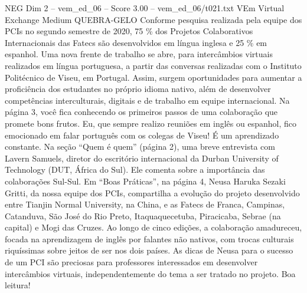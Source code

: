 \begin{textsample}{NEG Dim 2 – vem\_ed\_06 – Score 3.00 – vem\_ed\_06/t021.txt}  \label{ex:f2_neg_098}
VEm Virtual Exchange Medium QUEBRA-GELO Conforme pesquisa realizada pela equipe dos PCIs no segundo semestre de 2020, 75 \% dos Projetos Colaborativos Internacionais das Fatecs são desenvolvidos em língua inglesa e 25 \% em espanhol.
Uma nova frente de trabalho se abre, para intercâmbios virtuais realizados em língua portuguesa, a partir das conversas realizadas com o Instituto Politécnico de Viseu, em Portugal.
Assim, surgem oportunidades para aumentar a proficiência dos estudantes no próprio idioma nativo, além de desenvolver competências interculturais, digitais e de trabalho em equipe internacional.
Na página 3, você fica conhecendo os primeiros passos de uma colaboração que promete bons frutos.
Eu, que sempre realizo reuniões em inglês ou espanhol, fico emocionado em falar português com os colegas de Viseu!
É um aprendizado constante.
Na seção “Quem é quem” (página 2), uma breve entrevista com Lavern Samuels, diretor do escritório internacional da Durban University of Technology (DUT, África do Sul).
Ele comenta sobre a importância das colaborações Sul-Sul.
Em “Boas Práticas”, na página 4, Neusa Haruka Sezaki Gritti, da nossa equipe dos PCIs, compartilha a evolução do projeto desenvolvido entre Tianjin Normal University, na China, e as Fatecs de Franca, Campinas, Catanduva, São José do Rio Preto, Itaquaquecetuba, Piracicaba, Sebrae (na capital) e Mogi das Cruzes.
Ao longo de cinco edições, a colaboração amadureceu, focada na aprendizagem de inglês por falantes não nativos, com trocas culturais riquíssimas sobre jeitos de ser nos dois países.
As dicas de Neusa para o sucesso de um PCI são preciosas para professores interessados em desenvolver intercâmbios virtuais, independentemente do tema a ser tratado no projeto.
Boa leitura!

\end{textsample}
